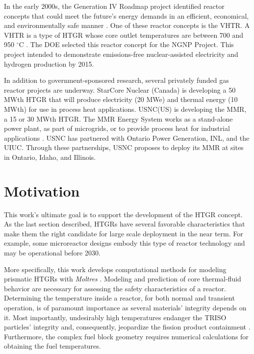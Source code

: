 In the early 2000s, the Generation IV Roadmap project \cite{doe-ne_technology_2002} identified reactor concepts that could meet the future's energy demands in an efficient, economical, and environmentally safe manner \cite{macdonald_ngnp_2003}.
One of these reactor concepts is the \gls{VHTR}.
A \gls{VHTR} is a type of HTGR whose core outlet temperatures are between 700 and 950 $^{\circ}$C \cite{gif_gif_2019}.
The \gls{DOE} selected this reactor concept for the \gls{NGNP} Project.
This project intended to demonstrate emissions-free nuclear-assisted electricity and hydrogen production by 2015.

In addition to government-sponsored research, several privately funded gas reactor projects are underway.
StarCore Nuclear \cite{star_core_nuclear_star_2015} (Canada) is developing a 50 MWth HTGR that will produce electricity (20 MWe) and thermal energy (10 MWth) for use in process heat applications.
\gls{USNC}(US) \cite{usnc_mmr_2019} is developing the \gls{MMR}, a 15 or 30 MWth HTGR.
The MMR Energy System works as a stand-alone power plant, as part of microgrids, or to provide process heat for industrial applications \cite{world_nuclear_news_micro_2020}.
USNC has partnered with Ontario Power Generation, \gls{INL}, and the \gls{UIUC}.
Through these partnerships, USNC proposes to deploy its MMR at sites in Ontario, Idaho, and Illinois.

\section{Motivation}

This work's ultimate goal is to support the development of the HTGR concept.
As the last section described, HTGRs have several favorable characteristics that make them the right candidate for large scale deployment in the near term.
For example, some microreactor designs embody this type of reactor technology and may be operational before 2030.

More specifically, this work develops computational methods for modeling prismatic \glspl{HTGR} with \textit{Moltres} \cite{lindsay_introduction_2018}.
Modeling and prediction of core thermal-fluid behavior are necessary for assessing the safety characteristics of a reactor.
Determining the temperature inside a reactor, for both normal and transient operation, is of paramount importance as several materials' integrity depends on it.
Most importantly, undesirably high temperatures endanger the TRISO particles' integrity and, consequently, jeopardize the fission product containment \cite{tak_numerical_2008}.
Furthermore, the complex fuel block geometry requires numerical calculations for obtaining the fuel temperatures.


